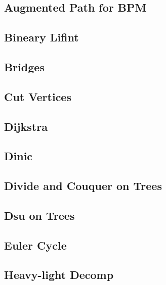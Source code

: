 \subsection{Augmented Path for BPM}
\raggedbottom
\subsection{Bineary Lifint}
\raggedbottom
\subsection{Bridges}
\raggedbottom
\subsection{Cut Vertices}
\raggedbottom
\subsection{Dijkstra}
\raggedbottom
\subsection{Dinic}
\raggedbottom
\subsection{Divide and Couquer on Trees}
\raggedbottom
\subsection{Dsu on Trees}
\raggedbottom
\subsection{Euler Cycle}
\raggedbottom
\subsection{Heavy-light Decomp}
\raggedbottom
